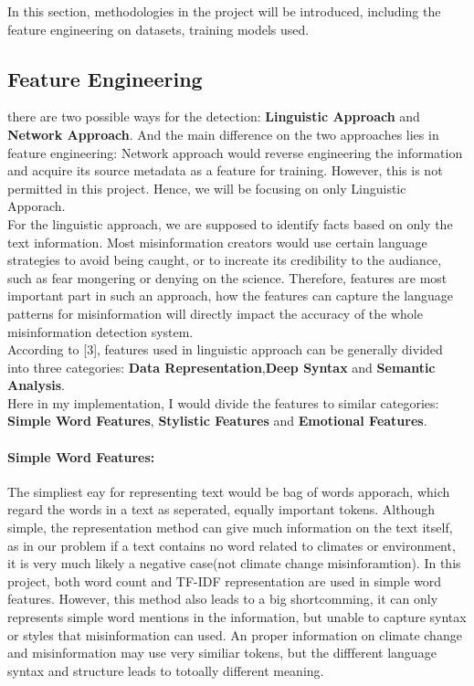 \documentclass[11pt,a4paper]{article}
\begin{document}
In this section, methodologies in the project will be introduced, including the feature engineering on datasets, training models used.
\subsection{Feature Engineering}
there are two possible ways for the detection: \textbf{Linguistic Approach} and \textbf{Network Approach}. And the main difference on the two approaches lies in feature engineering: Network approach would reverse engineering the information and acquire its source metadata as a feature for training. However, this is not permitted in this project. Hence, we will be focusing on only Linguistic Apporach.\\
For the linguistic approach, we are supposed to identify facts based on only the text information. Most misinformation creators would use certain language strategies to avoid being caught, or to increate its credibility to the audiance, such as fear mongering or denying on the science. Therefore, features are most important part in such an approach, how the features can capture the language patterns for misinformation will directly impact the accuracy of the whole misinformation detection system.\\
According to [3], features used in linguistic approach can be generally divided into three categories: \textbf{Data Representation},\textbf{Deep Syntax} and \textbf{Semantic Analysis}.\\ Here in my implementation, I would divide the features to similar categories: \textbf{Simple Word Features}, \textbf{Stylistic Features} and \textbf{Emotional Features}.



\paragraph{Simple Word Features:}
The simpliest eay for representing text would be bag of words apporach, which regard the words in a text as seperated, equally important tokens. Although simple, the representation method can give much information on the text itself, as in our problem if a text contains no word related to climates or environment, it is very much likely a negative case(not climate change misinforamtion). In this project, both word count and TF-IDF representation are used in simple word features. However, this method also leads to a big shortcomming, it can only represents simple word mentions in the information, but unable to capture syntax or styles that misinformation can used. An proper information on climate change and misinformation may use very similiar tokens, but the diffferent language syntax and structure leads to totoally different meaning.
\end{document}
